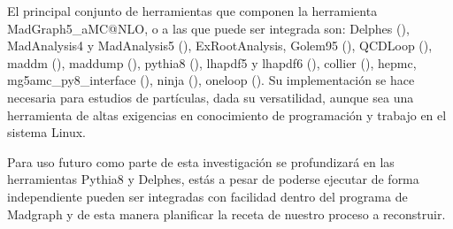 El principal conjunto de herramientas que componen la herramienta Mad\-Graph5\_\-a\-MC\-@NLO, o a las que puede ser integrada son: Delphes (\cite{de_favereau_delphes_2014-1}), MadAnalysis4 y MadAnalysis5 (\cite{conte_madanalysis_2013}), ExRootAnalysis, Golem95 (\cite{binoth_precise_2008}), QCDLoop (\cite{ellis_scalar_2008}), maddm (\cite{wang_novel_2018}), maddump (\cite{buonocore_event_2019}), pythia8 (\cite{sjostrand_introduction_2015-1}), lhapdf5 y lhapdf6 (\cite{buckley_lhapdf6_2015}), collier (\cite{denner_collier_2017}), hepmc, mg5amc\_py8\_interface (\cite{sjostrand_introduction_2015-1}), ninja (\cite{hirschi_tensor_2016, peraro_ninja_2014, mastrolia_integrand_2012}), oneloop (\cite{van_hameren_oneloop_2011}). Su implementación se hace necesaria para estudios de partículas, dada su versatilidad, aunque sea una herramienta de altas exigencias en conocimiento de programación y trabajo en el sistema Linux. 

Para uso futuro como parte de esta investigación se profundizará en las herramientas Pythia8 y Delphes, estás a pesar de poderse ejecutar de forma independiente pueden ser integradas con facilidad dentro del programa de Madgraph y de esta manera planificar la receta de nuestro proceso a reconstruir.
